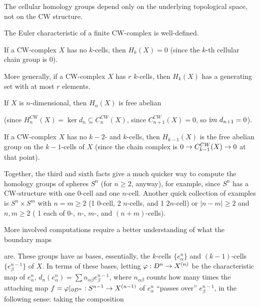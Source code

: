 \msk

The cellular homology groups depend only on the underlying topological space, not on the CW structure.

\ssk

The Euler characteristic of a finite CW-complex is well-defined.

\ssk

If a CW-complex $X$ has no $k$-cells, then $H_k(X)=0$ (since the $k$-th cellular chain group is $0$).

\ssk

More generally, if a CW-complex $X$ has $r$ $k$-cells, then $H_k(X)$ has a generating set with at most $r$ elements.

\ssk

If $X$ is $n$-dimensional, then $H_n(X)$ is free abelian 

(since $H_n^{CW}(X)=\ker d_n\subseteq C_n^{CW}(X)$, 
since $C_{n+1}^{CW}(X)=0$, so ${\text im}\ d_{n+1}=0$).

\ssk

If a CW-complex $X$ has no $k-2$- and $k$-cells, then $H_{k-1}(X)$ is the free abelian group on the 
$k-1$-cells of $X$ (since the chain complex is $0\rightarrow C_{k-1}^{CW}(X)\rightarrow 0$ at that point).

\msk

Together, the third and sixth facts give a much quicker way to compute the homology groups 
of spheres
$S^n$ (for $n\geq 2$, anyway), for example, since $S^n$ has a CW-structure with one $0$-cell
and one $n$-cell. Another quick collection of examples is $S^n\times S^m$ with $n=m\geq 2$
(1 0-cell, 2 $n$-cells, and 1 $2n$-cell) or $|n-m|\geq 2$ and $n,m\geq 2$ ( 1 each of 0-,
$n$-, $m$-, and $(n+m)$-cells).

\vfill
\eject

More involved computations require a better understanding of what the boundary maps

\ssk


\ssk

are. These groups have as bases, essentially, the $k$-cells $\{e^n_\alpha\}$ and $(k-1)$-cells $\{e^{n-1}_\beta\}$
of $X$. In terms of these bases, 
letting $\varphi:D^n\rightarrow X^{(n)}$ be the characteristic map of $e^n_\alpha$,
$d_n(e^n_\alpha)=\sum n_{\alpha\beta}e^{n-1}_\beta$, where
$n_{\alpha\beta}$ counts how many times the attaching map $f=\varphi|_{\partial D^n}:S^{n-1}\rightarrow X^{(n-1)}$ 
of $e^n_\alpha$ ``passes over''
$e^{n-1}_\beta$, in the following sense:
taking the composition

